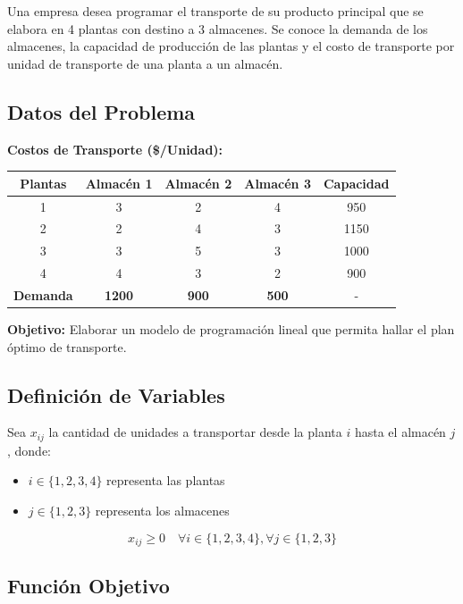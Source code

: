 \documentclass[12pt, a4paper, oneside]{book}
\theoremstyle{definition}
\begin{document}
Una empresa desea programar el transporte de su producto principal que se elabora en 4 plantas con destino a 3 almacenes. Se conoce la demanda de los almacenes, la capacidad de producción de las plantas y el costo de transporte por unidad de transporte de una planta a un almacén.

\subsection{Datos del Problema}

\textbf{Costos de Transporte (\$/Unidad):}

\begin{center}
\begin{tabular}{|c|c|c|c|c|}
\hline
\textbf{Plantas} & \textbf{Almacén 1} & \textbf{Almacén 2} & \textbf{Almacén 3} & \textbf{Capacidad} \\
\hline
1 & 3 & 2 & 4 & 950 \\
\hline
2 & 2 & 4 & 3 & 1150 \\
\hline
3 & 3 & 5 & 3 & 1000 \\
\hline
4 & 4 & 3 & 2 & 900 \\
\hline
\textbf{Demanda} & \textbf{1200} & \textbf{900} & \textbf{500} & - \\
\hline
\end{tabular}
\end{center}

\textbf{Objetivo:} Elaborar un modelo de programación lineal que permita hallar el plan óptimo de transporte.

\subsection{Definición de Variables}

Sea $x_{ij}$ la cantidad de unidades a transportar desde la planta $i$ hasta el almacén $j$, donde:
\begin{itemize}
    \item $i \in \{1, 2, 3, 4\}$ representa las plantas
    \item $j \in \{1, 2, 3\}$ representa los almacenes
\end{itemize}

$$x_{ij} \geq 0 \quad \forall i \in \{1,2,3,4\}, \forall j \in \{1,2,3\}$$

\subsection{Función Objetivo}
\end{document}
